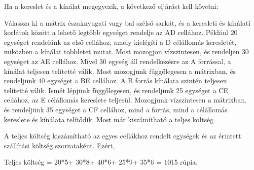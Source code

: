 Ha a kereslet és a kínálat megegyezik, a következő eljárást kell követni:


Válassza ki a mátrix északnyugati vagy bal szélső sarkát, és a keresleti és kínálati korlátok között a lehető legtöbb egységet rendelje az AD cellához. Például 20 egységet rendelünk az első cellához, amely kielégíti a D célállomás keresletét, miközben a kínálat többletet mutat.
Most mozogjon vízszintesen, és rendeljen 30 egységet az AE cellához. Mivel 30 egység áll rendelkezésre az A forrással, a kínálat teljesen telítetté válik.
Most mozogjunk függőlegesen a mátrixban, és rendeljünk 40 egységet a BE cellához. A B forrás kínálata szintén teljesen telítetté válik.
Ismét lépjünk függőlegesen, és rendeljünk 25 egységet a CE cellához, az E célállomás kereslete teljesül.
Mozogjunk vízszintesen a mátrixban, és rendeljünk 35 egységet a CF cellához, mind a forrás, mind a célállomás kereslete és kínálata telítődik. Most már kiszámítható a teljes költség.

A teljes költség kiszámítható az egyes cellákhoz rendelt egységek és az érintett szállítási költség szorzataként. Ezért,

Teljes költség = 20*5+ 30*8+ 40*6+ 25*9+ 35*6 = 1015 rúpia.


















